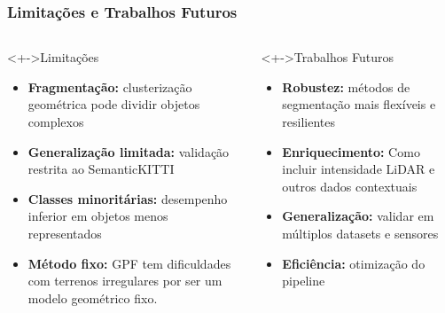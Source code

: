 \documentclass[aspectratio=169,t,xcolor=table]{beamer}
\begin{document}
\begin{frame}
    \frametitle{Limitações e Trabalhos Futuros}
    \begin{columns}[T]
        \begin{column}{.5\textwidth}
            \begin{block}<+->{Limitações}
                \begin{itemize}
                    \item<+-> \textbf{Fragmentação:} clusterização geométrica
                          pode dividir objetos complexos
                    \item<+-> \textbf{Generalização limitada:} validação
                          restrita ao SemanticKITTI
                    \item<+-> \textbf{Classes minoritárias:} desempenho
                          inferior em objetos menos representados
                    \item<+-> \textbf{Método fixo:} GPF tem dificuldades com
                          terrenos irregulares por ser um modelo
                          geométrico fixo.
                \end{itemize}
            \end{block}
        \end{column}
        \begin{column}{.5\textwidth}
            \begin{block}<+->{Trabalhos Futuros}
                \begin{itemize}
                    \item<+-> \textbf{Robustez:} métodos de segmentação mais
                          flexíveis e resilientes
                    \item<+-> \textbf{Enriquecimento:} Como incluir intensidade
                          LiDAR e outros dados contextuais
                    \item<+-> \textbf{Generalização:} validar em múltiplos
                          datasets e sensores
                    \item<+-> \textbf{Eficiência:} otimização do pipeline
                \end{itemize}
            \end{block}
        \end{column}
    \end{columns}
\end{frame}
\end{document}
